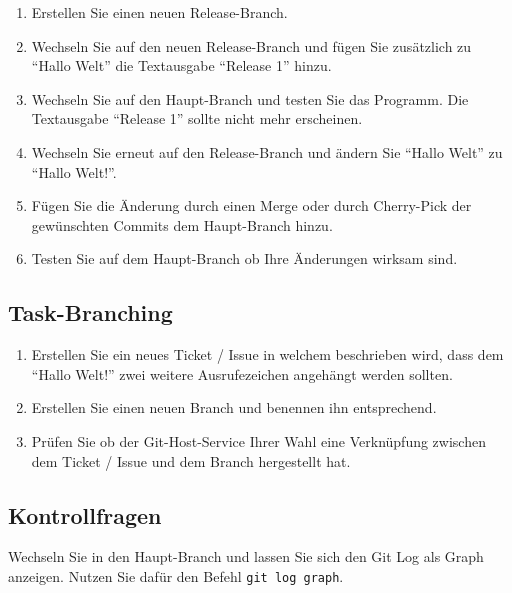 \begin{enumerate}
    \item Erstellen Sie einen neuen Release\hyp Branch.
 
    \item Wechseln Sie auf den neuen Release\hyp Branch und fügen Sie zusätzlich zu \enquote{Hallo Welt} die Textausgabe \enquote{Release 1} hinzu.
    
    \item Wechseln Sie auf den Haupt\hyp Branch und testen Sie das Programm. Die Textausgabe \enquote{Release 1} sollte nicht mehr erscheinen.
    
    \item Wechseln Sie erneut auf den Release\hyp Branch und ändern Sie \enquote{Hallo Welt} zu \enquote{Hallo Welt!}.

    \item Fügen Sie die Änderung durch einen Merge oder durch Cherry\hyp Pick der gewünschten Commits dem Haupt\hyp Branch hinzu.
    
    \item Testen Sie auf dem Haupt\hyp Branch ob Ihre Änderungen wirksam sind.
\end{enumerate}

\subsection{Task\hyp Branching}

\begin{enumerate}
    \item Erstellen Sie ein neues Ticket / Issue in welchem beschrieben wird, dass dem \enquote{Hallo Welt!} zwei weitere Ausrufezeichen angehängt werden sollten.

    \item Erstellen Sie einen neuen Branch und benennen ihn entsprechend.
    
    \item Prüfen Sie ob der Git\hyp Host\hyp Service Ihrer Wahl eine Verknüpfung zwischen dem Ticket / Issue und dem Branch hergestellt hat.
\end{enumerate}

\subsection{Kontrollfragen}

Wechseln Sie in den Haupt\hyp Branch und lassen Sie sich den Git Log als Graph anzeigen. Nutzen Sie dafür den Befehl \texttt {git log \textendash\textendash graph}.

